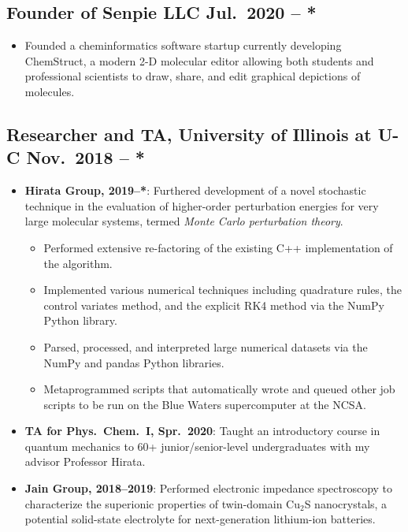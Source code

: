 \documentclass{article}
\newcommand{\TM}{\texttrademark}
\begin{document}
\subsection{Founder of Senpie LLC \hfill Jul.\ 2020 -- *}
\begin{itemize}[noitemsep, nolistsep]
	\item Founded a cheminformatics software startup currently developing
		ChemStruct\TM, a modern 2-D molecular editor allowing both students and
		professional scientists to draw, share, and edit graphical depictions of
		molecules.
\end{itemize}

\subsection{Researcher and TA, University of Illinois at U-C
            \hfill Nov.\ 2018 -- *}
\begin{itemize}[noitemsep,nolistsep]
	\item \textbf{Hirata Group, 2019--*}: Furthered development of a novel
		stochastic technique in the evaluation of higher-order
		perturbation energies for very large molecular systems, termed
		\emph{Monte Carlo perturbation theory}.

		\begin{itemize}
			\item Performed extensive re-factoring of the existing C++
				implementation of the algorithm.

			\item Implemented various numerical techniques
				including quadrature rules, the control variates
				method, and the explicit RK4 method via the
				NumPy Python library.

			\item Parsed, processed, and interpreted large numerical datasets
				via the NumPy and pandas Python libraries.

			\item Metaprogrammed scripts that automatically wrote and queued
				other job scripts to be run on the Blue Waters supercomputer at
				the NCSA.
		\end{itemize}

	\item \textbf{TA for Phys.\ Chem.\ I, Spr.\ 2020}: Taught an
		introductory course in quantum mechanics to 60+
		junior/senior-level undergraduates with my advisor Professor
		Hirata.

	\item \textbf{Jain Group, 2018--2019}: Performed electronic impedance
		spectroscopy to characterize the superionic properties of twin-domain
		Cu$_2$S nanocrystals, a potential solid-state electrolyte for
		next-generation lithium-ion batteries.
\end{itemize}
\end{document}
